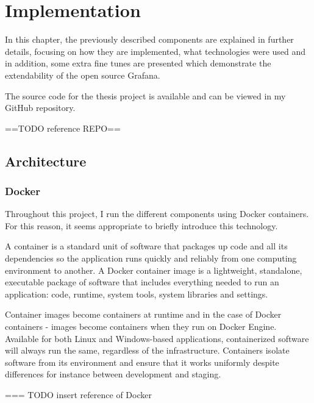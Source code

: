 \chapter{Implementation}

In this chapter, the previously described components are explained in further details, focusing on how they are implemented, what technologies were used and in addition, some extra fine tunes are presented which demonstrate the extendability of the open source Grafana.

The source code for the thesis project is available and can be viewed in my GitHub repository.

\begin{center}
	 ==TODO reference REPO==
\end{center}

\section{Architecture}

\subsection{Docker}

Throughout this project, I run the different components using Docker containers. For this reason, it seems appropriate to briefly introduce this technology.

A container is a standard unit of software that packages up code and all its dependencies so the application runs quickly and reliably from one computing environment to another. A Docker container image is a lightweight, standalone, executable package of software that includes everything needed to run an application: code, runtime, system tools, system libraries and settings.

Container images become containers at runtime and in the case of Docker containers - images become containers when they run on Docker Engine. Available for both Linux and Windows-based applications, containerized software will always run the same, regardless of the infrastructure. Containers isolate software from its environment and ensure that it works uniformly despite differences for instance between development and staging.

\begin{center}
	=== TODO insert reference of Docker
\end{center}


